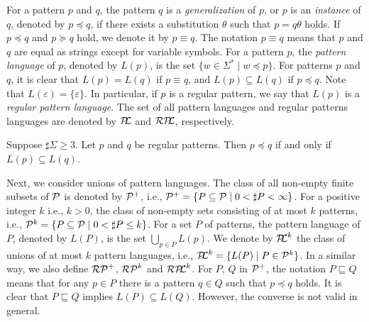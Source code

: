 For a pattern $p$ and $q$,
the pattern $q$ is a \textit{generalization} of $p$, or $p$ is an \textit{instance} of $q$, denoted by $p \preceq q$,
if there exists a substitution $\theta$ such that $p = q\theta$ holds.
If $p \preceq q$ and $p \succeq q$ hold, we denote it by $p \equiv q$.
The notation $p \equiv q$ means that $p$ and $q$ are equal as strings except for variable symbols. 
For a pattern $p$, the \textit{pattern language} of $p$, denoted by $L(p)$, is the set $\{w \in \Sigma^{\ast} \mid w \preceq p\}$.
For patterns $p$ and $q$, it is clear that $L(p) = L(q)$ if $p \equiv q$, and $L(p) \subseteq L(q)$ if $p \preceq q$.
Note that $L(\varepsilon) = \{\varepsilon\}$.
In particular, if $p$ is a regular pattern, we say that $L(p)$ is a \textit{regular pattern language}.
The set of all pattern languages and regular patterns languages are denoted by $\mathcal{P\!\!L}$ and $\mathcal{RP\!\!L}$, respectively.

\begin{lem}\label{regularPatternEquivalence}
  Suppose $\sharp \Sigma \geq 3$. Let $p$ and $q$ be regular patterns.
  Then $p \preceq q$ if and only if $L(p) \subseteq L(q)$.
\end{lem}

Next, we consider unions of pattern languages. %
The class of all non-empty finite subsets of $\mathcal{P}$ is denoted by $\mathcal{P}^{+}$, i.e.,
$\mathcal{P}^{+} = \{P \subseteq \mathcal{P} \mid 0 < \sharp P < \infty\}$.
For a positive integer $k$ i.e., $k>0$, the class of non-empty sets consisting of at most $k$ patterns, i.e.,
$\mathcal{P}^{k} = \{P \subseteq \mathcal{P} \mid 0< \sharp P \leq k\}$.
For a set $P$ of patterns, the pattern language of $P$, denoted by $L(P)$, is the set $\bigcup_{p \in P}L(p)$.
We denote by $\mathcal{P\!\!L}^{k}$ the class of unions of at most $k$ pattern languages,
i.e., $\mathcal{P\!\!L}^{k} = \{L(P) \mid P \in \mathcal{P}^{k}\}$.
In a similar way, we also define $\mathcal{RP}^{+}$, $\mathcal{RP}^{k}$ and $\mathcal{RP\!\!L}^{k}$.
For $P$, $Q$ in $\mathcal{P}^{+}$,
the notation $P \sqsubseteq Q$ means that for any $p \in P$ there is a pattern $q \in Q$ such that $p \preceq q$ holds.
It is clear that $P \sqsubseteq Q$ implies $L(P) \subseteq L(Q)$.
However, the converse is not valid in general.